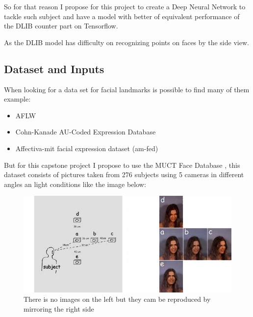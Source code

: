 \documentclass[11pt]{article}
\begin{document}
So for that reason I propose for this project to create a Deep Neural Network to
tackle such subject and have a model with better of equivalent performance of
the DLIB counter part on Tensorflow.

As the DLIB model has difficulty on recognizing points on faces by the side
view. 


\subsection{Dataset and Inputs}
\label{sec:org7053fa3}

When looking for a data set for facial landmarks is possible to find many of
them example:

\begin{itemize}
\item AFLW \cite{sagonas2013300}
\item Cohn-Kanade AU-Coded Expression Database \cite{cohn1999cohn}
\item Affectiva-mit facial expression dataset (am-fed) \cite{mcduff2013affectiva}
\end{itemize}

But for this capstone project I propose to use the MUCT Face Database
\cite{Milborrow10}, this dataset consists of pictures taken from 276 subjects
using 5 cameras in different angles an light conditions like the image below:

\begin{figure}[htbp]
\centering
\includegraphics[width=.9\linewidth]{./images/muct-views-lores.jpg}
\caption{There is no images on the left but they cam be reproduced by mirroring the right side}
\end{figure}
\end{document}

